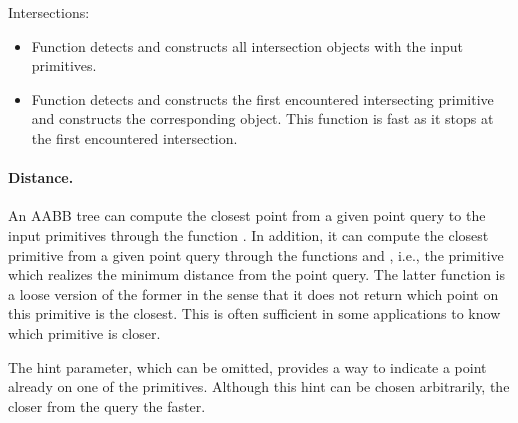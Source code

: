 Intersections:
\begin{itemize}
\item Function  detects and constructs all intersection objects with the input primitives.
\item Function  detects and constructs the first encountered intersecting primitive and constructs the corresponding object. This function is fast as it stops at the first encountered intersection.
\end{itemize}

\paragraph{Distance.} An AABB tree can compute the closest point from a given point query to the input primitives through the function . In addition, it can compute the closest primitive from a given point query through the functions  and , i.e., the primitive which realizes the minimum distance from the point query. The latter function is a loose version of the former in the sense that it does not return which point on this primitive is the closest. This is often sufficient in some applications to know which primitive is closer. 

The hint parameter, which can be omitted, provides a way to indicate a point already on one of the primitives. Although this hint can be chosen arbitrarily, the closer from the query the faster. 